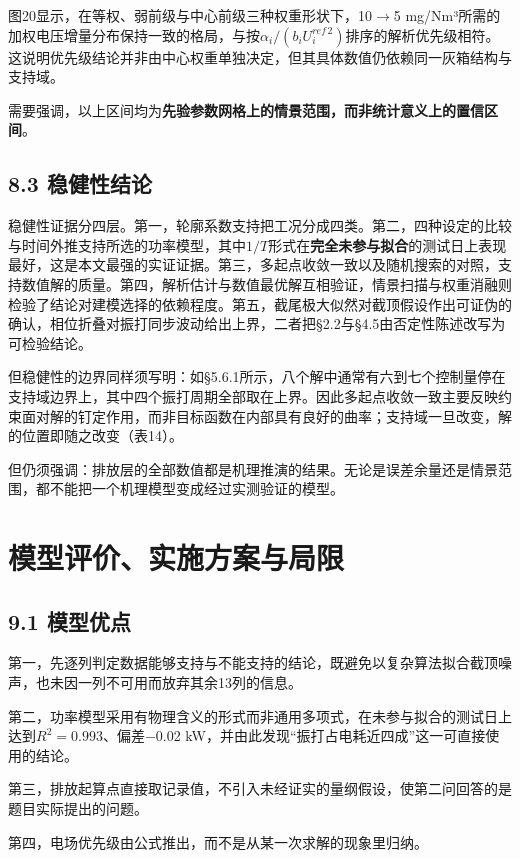 \documentclass[UTF8,zihao=5,a4paper]{ctexart}
\begin{document}
图20显示，在等权、弱前级与中心前级三种权重形状下，10$\rightarrow$5 mg/Nm³所需的加权电压增量分布保持一致的格局，与按$\alpha_i/(b_iU^{ref\,2}_i)$排序的解析优先级相符。这说明优先级结论并非由中心权重单独决定，但其具体数值仍依赖同一灰箱结构与支持域。

需要强调，以上区间均为\textbf{先验参数网格上的情景范围，而非统计意义上的置信区间}。

\subsection*{8.3 稳健性结论}

稳健性证据分四层。第一，轮廓系数支持把工况分成四类。第二，四种设定的比较与时间外推支持所选的功率模型，其中$1/T$形式在\textbf{完全未参与拟合}的测试日上表现最好，这是本文最强的实证证据。第三，多起点收敛一致以及随机搜索的对照，支持数值解的质量。第四，解析估计与数值最优解互相验证，情景扫描与权重消融则检验了结论对建模选择的依赖程度。第五，截尾极大似然对截顶假设作出可证伪的确认，相位折叠对振打同步波动给出上界，二者把§2.2与§4.5由否定性陈述改写为可检验结论。

但稳健性的边界同样须写明：如§5.6.1所示，八个解中通常有六到七个控制量停在支持域边界上，其中四个振打周期全部取在上界。因此多起点收敛一致主要反映约束面对解的钉定作用，而非目标函数在内部具有良好的曲率；支持域一旦改变，解的位置即随之改变（表14）。

但仍须强调：排放层的全部数值都是机理推演的结果。无论是误差余量还是情景范围，都不能把一个机理模型变成经过实测验证的模型。

\section{模型评价、实施方案与局限}

\subsection*{9.1 模型优点}

第一，先逐列判定数据能够支持与不能支持的结论，既避免以复杂算法拟合截顶噪声，也未因一列不可用而放弃其余13列的信息。

第二，功率模型采用有物理含义的形式而非通用多项式，在未参与拟合的测试日上达到$R^2=0.993$、偏差−0.02 kW，并由此发现“振打占电耗近四成”这一可直接使用的结论。

第三，排放起算点直接取记录值，不引入未经证实的量纲假设，使第二问回答的是题目实际提出的问题。

第四，电场优先级由公式推出，而不是从某一次求解的现象里归纳。
\end{document}
